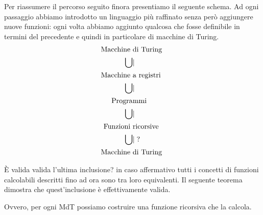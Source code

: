 Per riassumere il percorso seguito finora presentiamo il seguente schema.
Ad ogni passaggio abbiamo introdotto un linguaggio pi\`u
raffinato senza per\`o aggiungere nuove funzioni:
 ogni volta abbiamo aggiunto qualcosa che fosse definibile in
termini del precedente e quindi in particolare di macchine di Turing.
\begin{align*}
{\rm Macchine\ }&{\rm di\ Turing\ }\\
\bigcup &|\\
{\rm Macchine\ }&{\rm a\ registri\ }\\
\bigcup &|\\
{\rm Progra}&{\rm mmi}\\
\bigcup &|\\
{\rm Funzioni\ }&{\rm ricorsive\ }\\
\bigcup &| \; {\rm?}\\
{\rm Macchine\ }&{\rm di\ Turing\ }\\
\end{align*}

È valida valida l'ultima inclusione? in caso affermativo tutti i
concetti di funzioni calcolabili descritti fino ad ora sono tra loro
equivalenti. Il seguente teorema dimostra che quest'inclusione è
effettivamente valida.

\begin{thm}
Ovvero, per ogni MdT possiamo costruire una funzione ricorsiva che la calcola.
\end{thm}

